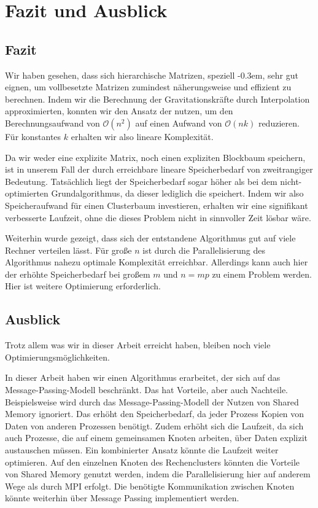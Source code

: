 \chapter{Fazit und Ausblick}
\label{chp:Conclusions}
  \section{Fazit}
    Wir haben gesehen, dass sich hierarchische Matrizen, speziell \hquad \kern-0.3em, sehr gut eignen, um vollbesetzte Matrizen zumindest näherungsweise und effizient zu berechnen.
    Indem wir die Berechnung der Gravitationskräfte durch Interpolation approximierten, konnten wir den Ansatz der \hquad nutzen, um den Berechnungsaufwand von $\mathcal{O}(n^2)$ auf einen
    Aufwand von $\mathcal{O}(nk)$ reduzieren. Für konstantes $k$ erhalten wir also lineare Komplexität.
    
    Da wir weder eine explizite Matrix, noch einen expliziten Blockbaum speichern, ist in unserem Fall der durch \hquad erreichbare lineare Speicherbedarf
    von zweitrangiger Bedeutung. Tatsächlich liegt der Speicherbedarf sogar höher als bei dem nicht-optimierten Grundalgorithmus, da dieser lediglich die  speichert. Indem wir
    also Speicheraufwand für einen Clusterbaum investieren, erhalten wir eine signifikant verbesserte Laufzeit, ohne die dieses Problem nicht in sinnvoller Zeit lösbar wäre.
    
    Weiterhin wurde gezeigt, dass sich der entstandene Algorithmus gut auf viele Rechner verteilen lässt. Für große $n$ ist durch die Parallelisierung des Algorithmus nahezu optimale Komplexität 
    erreichbar. Allerdings kann auch hier der erhöhte Speicherbedarf bei großem $m$ und $n=mp$ zu einem Problem werden. Hier ist weitere Optimierung erforderlich.
    
  \section{Ausblick}
  \label{sec:ausblick}
    Trotz allem was wir in dieser Arbeit erreicht haben, bleiben noch viele Optimierungsmöglichkeiten. 
    
    In dieser Arbeit haben wir einen Algorithmus erarbeitet, der sich auf das Message-Passing-Modell beschränkt. Das hat Vorteile,
    aber auch Nachteile. Beispielsweise wird durch das Message-Passing-Modell der Nutzen von Shared Memory ignoriert. Das erhöht den Speicherbedarf, da jeder Prozess Kopien von Daten von anderen
    Prozessen benötigt. Zudem erhöht sich die Laufzeit, da sich auch Prozesse, die auf einem gemeinsamen Knoten arbeiten, über Daten explizit austauschen müssen. Ein kombinierter Ansatz könnte
    die Laufzeit weiter optimieren. Auf den einzelnen Knoten des Rechenclusters könnten die Vorteile von Shared Memory genutzt werden, indem die Parallelisierung hier auf anderem Wege als durch 
    MPI erfolgt. Die benötigte Kommunikation zwischen Knoten könnte weiterhin über Message Passing implementiert werden.
    
